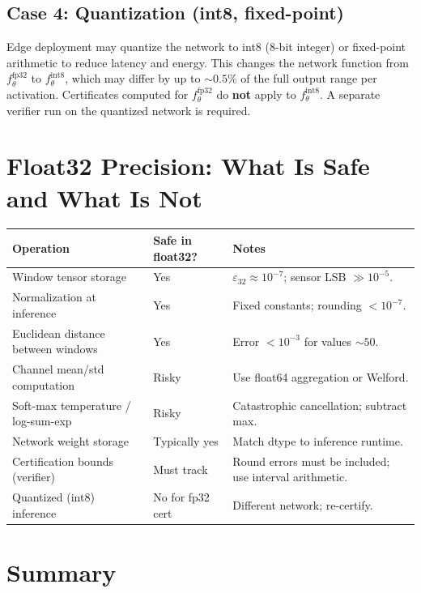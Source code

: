 \documentclass[11pt, a4paper]{article}
\theoremstyle{definition}
\theoremstyle{plain}
\newcommand{\eps}{\varepsilon}
\begin{document}
\subsection{Case 4: Quantization (int8, fixed-point)}

Edge deployment may quantize the network to int8 (8-bit integer) or fixed-point
arithmetic to reduce latency and energy. This changes the network function from
$f_\theta^{\text{fp32}}$ to $f_\theta^{\text{int8}}$, which may differ by up to
$\sim 0.5\%$ of the full output range per activation. Certificates computed for
$f_\theta^{\text{fp32}}$ do \textbf{not} apply to $f_\theta^{\text{int8}}$.
A separate verifier run on the quantized network is required.

\section{Float32 Precision: What Is Safe and What Is Not}

\begin{center}
\small
\begin{tabularx}{\linewidth}{@{}lYY@{}}
\toprule
Operation & Safe in float32? & Notes \\
\midrule
Window tensor storage & Yes & $\eps_{32} \approx 10^{-7}$; sensor LSB $\gg 10^{-5}$. \\
Normalization at inference & Yes & Fixed constants; rounding $< 10^{-7}$. \\
Euclidean distance between windows & Yes & Error $< 10^{-3}$ for values $\sim 50$. \\
Channel mean/std computation & Risky & Use float64 aggregation or Welford. \\
Soft-max temperature / log-sum-exp & Risky & Catastrophic cancellation; subtract max. \\
Network weight storage & Typically yes & Match dtype to inference runtime. \\
Certification bounds (verifier) & Must track & Round errors must be included; use interval arithmetic. \\
Quantized (int8) inference & No for fp32 cert & Different network; re-certify. \\
\bottomrule
\end{tabularx}
\end{center}

\section{Summary}
\end{document}
